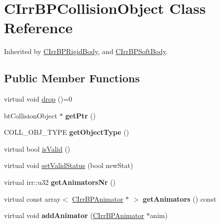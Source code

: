 \hypertarget{class_c_irr_b_p_collision_object}{
\section{CIrrBPCollisionObject Class Reference}
\label{class_c_irr_b_p_collision_object}
}


Inherited by \hyperlink{class_c_irr_b_p_rigid_body}{CIrrBPRigidBody}, and \hyperlink{class_c_irr_b_p_soft_body}{CIrrBPSoftBody}.

\subsection*{Public Member Functions}
\begin{DoxyCompactItemize}
\item 
virtual void \hyperlink{class_c_irr_b_p_collision_object_a8fda1f4f6c5f34f42c51645baeb436ca}{drop} ()=0
\item 
\hypertarget{class_c_irr_b_p_collision_object_a5de2043c24848bff3bcd61dc84830eae}{
btCollisionObject $\ast$ {\bfseries getPtr} ()}
\label{class_c_irr_b_p_collision_object_a5de2043c24848bff3bcd61dc84830eae}

\item 
\hypertarget{class_c_irr_b_p_collision_object_a0d083747feddfe0097ff193f260fc272}{
COLL\_\-OBJ\_\-TYPE {\bfseries getObjectType} ()}
\label{class_c_irr_b_p_collision_object_a0d083747feddfe0097ff193f260fc272}

\item 
virtual bool \hyperlink{class_c_irr_b_p_collision_object_ae2739b17e823ce5850400a5c1d97be44}{isValid} ()
\item 
virtual void \hyperlink{class_c_irr_b_p_collision_object_a7dd1e62100c72cebd6c6758d07567f25}{setValidStatus} (bool newStat)
\item 
\hypertarget{class_c_irr_b_p_collision_object_a790662278fc1d96e087b89f59433a464}{
virtual irr::u32 {\bfseries getAnimatorsNr} ()}
\label{class_c_irr_b_p_collision_object_a790662278fc1d96e087b89f59433a464}

\item 
\hypertarget{class_c_irr_b_p_collision_object_a95043ef7629302c9d1b57339110aeb15}{
virtual const array$<$ \hyperlink{class_c_irr_b_p_animator}{CIrrBPAnimator} $\ast$ $>$ {\bfseries getAnimators} () const }
\label{class_c_irr_b_p_collision_object_a95043ef7629302c9d1b57339110aeb15}

\item 
\hypertarget{class_c_irr_b_p_collision_object_a5cc22a8625ba5a53b97b5da65f33c5f8}{
virtual void {\bfseries addAnimator} (\hyperlink{class_c_irr_b_p_animator}{CIrrBPAnimator} $\ast$anim)}
\label{class_c_irr_b_p_collision_object_a5cc22a8625ba5a53b97b5da65f33c5f8}


\end{DoxyCompactItemize}
